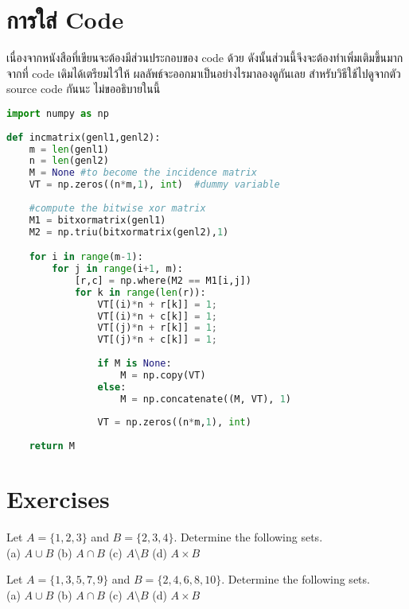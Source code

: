 \section{การใส่ Code }
 เนื่องจากหนังสือที่เขียนจะต้องมีส่วนประกอบของ code ด้วย ดังนั้นส่วนนี้จึงจะต้องทำเพิ่มเติมขึ้นมากจากที่ code เดิมได้เตรียมไว้ให้ ผลลัพธ์จะออกมาเป็นอย่างไรมาลองดูกันเลย 
สำหรับวิธีใช้ไปดูจากตัว source code กันนะ ไม่ขออธิบายในนี้ 

\begin{lstlisting}[language=python, caption=Python example]
import numpy as np
    
def incmatrix(genl1,genl2):
    m = len(genl1)
    n = len(genl2)
    M = None #to become the incidence matrix
    VT = np.zeros((n*m,1), int)  #dummy variable
    
    #compute the bitwise xor matrix
    M1 = bitxormatrix(genl1)
    M2 = np.triu(bitxormatrix(genl2),1) 

    for i in range(m-1):
        for j in range(i+1, m):
            [r,c] = np.where(M2 == M1[i,j])
            for k in range(len(r)):
                VT[(i)*n + r[k]] = 1;
                VT[(i)*n + c[k]] = 1;
                VT[(j)*n + r[k]] = 1;
                VT[(j)*n + c[k]] = 1;
                
                if M is None:
                    M = np.copy(VT)
                else:
                    M = np.concatenate((M, VT), 1)
                
                VT = np.zeros((n*m,1), int)
    
    return M
\end{lstlisting}

\section*{Exercises}

\begin{exercise}
  Let $A = \{1, 2, 3\}$ and $B = \{2, 3, 4\}$.
  Determine the following sets. \\
  (a) $A \cup B$ \quad
  (b) $A \cap B$ \quad
  (c) $A \setminus B$ \quad
  (d) $A \times B$
\end{exercise}

\begin{exercise}
  Let $A = \{1, 3, 5, 7, 9\}$ and $B = \{2, 4, 6, 8, 10\}$.
  Determine the following sets. \\
  (a) $A \cup B$ \quad
  (b) $A \cap B$ \quad
  (c) $A \setminus B$ \quad
  (d) $A \times B$
\end{exercise}

